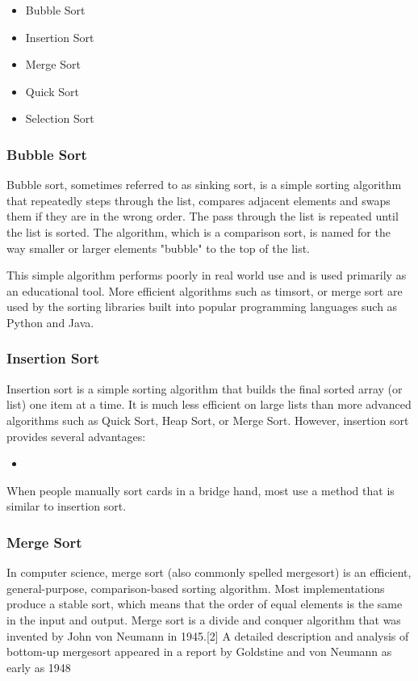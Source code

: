 \begin{itemize}
    \item Bubble Sort
    \item Insertion Sort
    \item Merge Sort
    \item Quick Sort
    \item Selection Sort
\end{itemize}

\subsubsection{Bubble Sort}
Bubble sort, sometimes referred to as sinking sort, is a simple sorting algorithm that repeatedly steps through the list, compares adjacent elements and swaps them if they are in the wrong order. The pass through the list is repeated until the list is sorted. The algorithm, which is a comparison sort, is named for the way smaller or larger elements "bubble" to the top of the list.
\par
\bigskip
This simple algorithm performs poorly in real world use and is used primarily as an educational tool. More efficient algorithms such as timsort, or merge sort are used by the sorting libraries built into popular programming languages such as Python and Java.

\subsubsection{Insertion Sort}
Insertion sort is a simple sorting algorithm that builds the final sorted array (or list) one item at a time. It is much less efficient on large lists than more advanced algorithms such as Quick Sort, Heap Sort, or Merge Sort. However, insertion sort provides several advantages:

\begin{itemize}
    \item 
\end{itemize}

When people manually sort cards in a bridge hand, most use a method that is similar to insertion sort.

\subsubsection{Merge Sort}
In computer science, merge sort (also commonly spelled mergesort) is an efficient, general-purpose, comparison-based sorting algorithm. Most implementations produce a stable sort, which means that the order of equal elements is the same in the input and output. Merge sort is a divide and conquer algorithm that was invented by John von Neumann in 1945.[2] A detailed description and analysis of bottom-up mergesort appeared in a report by Goldstine and von Neumann as early as 1948

